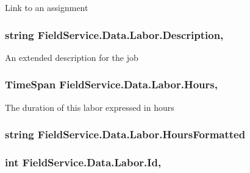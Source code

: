 Link to an assignment 

\hypertarget{class_field_service_1_1_data_1_1_labor_affd6db8b708ec765161594626e22e875}{
\subsubsection[{Description}]{\setlength{\rightskip}{0pt plus 5cm}string Field\+Service.\+Data.\+Labor.\+Description\hspace{0.3cm}{\ttfamily [get]}, {\ttfamily [set]}}}\label{class_field_service_1_1_data_1_1_labor_affd6db8b708ec765161594626e22e875}


An extended description for the job 

\hypertarget{class_field_service_1_1_data_1_1_labor_a9e525f27f4946eb2346cc14edf524f3b}{
\subsubsection[{Hours}]{\setlength{\rightskip}{0pt plus 5cm}Time\+Span Field\+Service.\+Data.\+Labor.\+Hours\hspace{0.3cm}{\ttfamily [get]}, {\ttfamily [set]}}}\label{class_field_service_1_1_data_1_1_labor_a9e525f27f4946eb2346cc14edf524f3b}


The duration of this labor expressed in hours 

\hypertarget{class_field_service_1_1_data_1_1_labor_abeebb1b52562440896e8e7f13637bf11}{
\subsubsection[{Hours\+Formatted}]{\setlength{\rightskip}{0pt plus 5cm}string Field\+Service.\+Data.\+Labor.\+Hours\+Formatted\hspace{0.3cm}{\ttfamily [get]}}}\label{class_field_service_1_1_data_1_1_labor_abeebb1b52562440896e8e7f13637bf11}
\hypertarget{class_field_service_1_1_data_1_1_labor_aa814a8dca869d92e57e18fbbed42bd94}{
\subsubsection[{Id}]{\setlength{\rightskip}{0pt plus 5cm}int Field\+Service.\+Data.\+Labor.\+Id\hspace{0.3cm}{\ttfamily [get]}, {\ttfamily [set]}}}\label{class_field_service_1_1_data_1_1_labor_aa814a8dca869d92e57e18fbbed42bd94}



